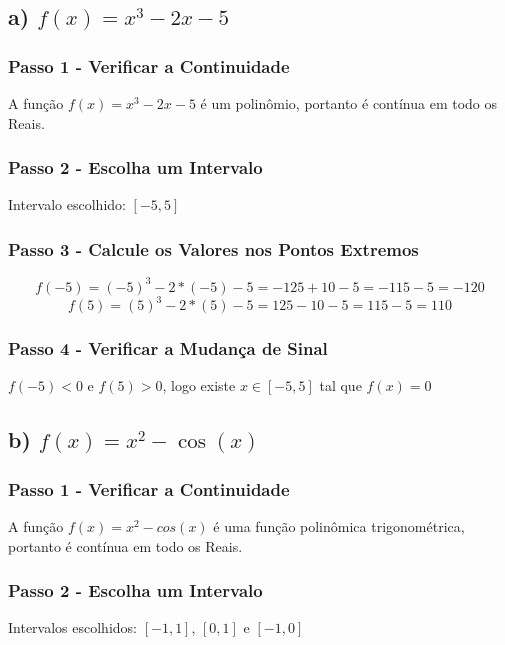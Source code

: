 \documentclass{article}
\begin{document}
\subsection{\texorpdfstring{a) $f(x) = x^3 - 2x - 5$}{a) f(x) = x3 - 2x - 5}}

    \subsubsection{Passo 1 - Verificar a Continuidade}
        A função $f(x) = x^3 - 2x - 5$ é um polinômio, portanto é contínua em todo os Reais.
    \subsubsection{Passo 2 - Escolha um Intervalo}
            Intervalo escolhido: $[-5, 5]$

    \subsubsection{Passo 3 - Calcule os Valores nos Pontos Extremos}
        \[
            f(-5) = (-5)^3 - 2*(-5) - 5 = - 125 + 10 - 5 = - 115 - 5 = - 120
        \]
        \[
            f(5) = (5)^3 - 2*(5) - 5 = 125 - 10 - 5 = 115 - 5 = 110
        \]

\subsubsection{Passo 4 - Verificar a Mudança de Sinal}
        $f(-5) < 0$ e $f(5) > 0$, logo existe $x \in [-5,5]$ tal que $f(x) = 0$

\subsection{\texorpdfstring{b) $f(x) = x^2 - \cos(x)$}{b) f(x) = x2 - cos(x)}}

    \subsubsection{Passo 1 - Verificar a Continuidade}
        A função $f(x) = x^2 - cos(x)$ é uma função polinômica trigonométrica, portanto é contínua em todo os Reais.
    \subsubsection{Passo 2 - Escolha um Intervalo}
            Intervalos escolhidos: $[-1,1]$, $[0,1]$ e  $[-1,0]$
\end{document}
